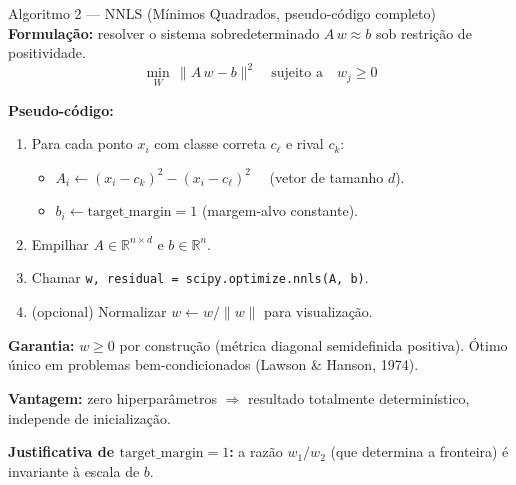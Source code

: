 \documentclass[aspectratio=169,10pt]{beamer}
\begin{document}
\begin{frame}{Algoritmo 2 --- NNLS (M\'inimos Quadrados, pseudo-c\'odigo completo)}
  \scriptsize
  \textbf{Formula\c{c}\~ao:} resolver o sistema sobredeterminado $A\,w \approx b$ sob restri\c{c}\~ao de positividade.
  \[
    \min_{W}\, \|A\,w - b\|^2 \quad \text{sujeito a}\quad w_j \geq 0
  \]

  \textbf{Pseudo-c\'odigo:}
  \begin{enumerate}
    \item Para cada ponto $x_i$ com classe correta $c_{\ell}$ e rival $c_k$:
      \begin{itemize}
        \item $A_i \leftarrow (x_i - c_k)^2 - (x_i - c_{\ell})^2 \quad$ (vetor de tamanho $d$).
        \item $b_i \leftarrow \text{target\_margin} = 1$ (margem-alvo constante).
      \end{itemize}
    \item Empilhar $A \in \mathbb{R}^{n \times d}$ e $b \in \mathbb{R}^n$.
    \item Chamar \texttt{w, residual = scipy.optimize.nnls(A, b)}.
    \item (opcional) Normalizar $w \leftarrow w / \|w\|$ para visualiza\c{c}\~ao.
  \end{enumerate}

  \textbf{Garantia:} $w \geq 0$ por constru\c{c}\~ao (m\'etrica diagonal semidefinida positiva). \'Otimo \'unico em problemas bem-condicionados (Lawson \& Hanson, 1974).
  \medskip

  \textbf{Vantagem:} zero hiperpar\^ametros $\Rightarrow$ resultado totalmente determin\'istico, independe de inicializa\c{c}\~ao.
  \medskip

  \textbf{Justificativa de $\text{target\_margin}=1$:} a raz\~ao $w_1/w_2$ (que determina a fronteira) \'e invariante \`a escala de $b$.
\end{frame}
\end{document}
